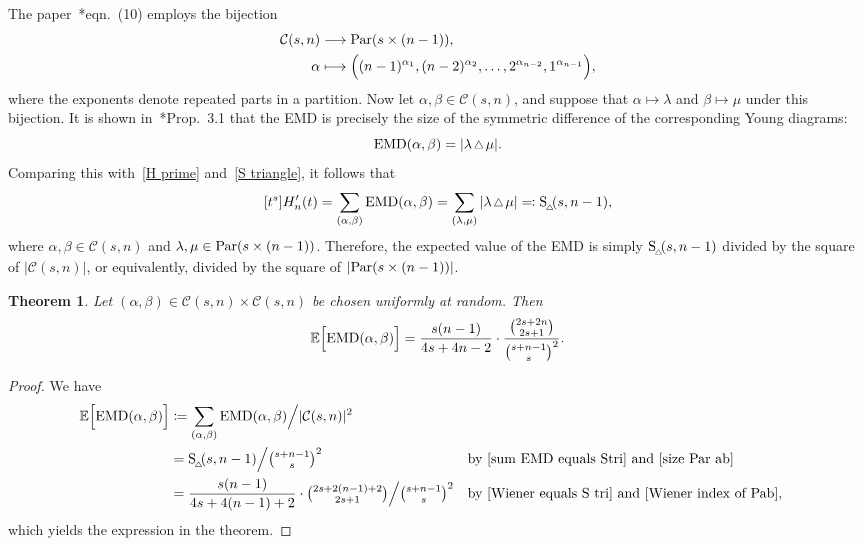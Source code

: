 \documentclass[11pt]{amsart}
\theoremstyle{plain}
\newtheorem{theorem}{Theorem}[section]
\theoremstyle{definition}
\numberwithin{equation}{section}
\newcommand{\C}{\mathcal{C}}
\newcommand{\EMD}{{\rm EMD}}
\newcommand{\Par}{{\rm Par}}
\newcommand{\smtriangle}{\scalebox{.8}{$\,\triangle\,$}}
\newcommand{\Stri}{{\rm S}_{_{\!\triangle\!\!}}}
\begin{document}
The paper~\cite{Erickson23}*{eqn.~(10)} employs the bijection
\begin{align*}
    \C(s,n) &\longrightarrow \Par(s \times (n-1)),\\
    \alpha & \longmapsto \Big((n-1)^{\alpha_1}, (n-2)^{\alpha_2}, \ldots, 2^{\alpha_{n-2}}, 1^{\alpha_{n-1}}\Big),
\end{align*}
where the exponents denote repeated parts in a partition.
Now let $\alpha,\beta \in \C(s,n)$, and suppose that $\alpha \mapsto \lambda$ and $\beta \mapsto \mu$ under this bijection.
It is shown in~\cite{Erickson23}*{Prop.~3.1} that the EMD is precisely the size of the symmetric difference of the corresponding Young diagrams:
\[
    \EMD(\alpha,\beta) = |\lambda \smtriangle \mu|.
\]
Comparing this with~\eqref{H prime} and~\eqref{S triangle}, it follows that 
\begin{equation}
\label{sum EMD equals Stri}
    [t^s] H'_n(t) = \sum_{(\alpha,\beta)} \EMD(\alpha,\beta) = \sum_{(\lambda,\mu)}  |\lambda \smtriangle \mu| \eqqcolon \Stri(s, n-1),
\end{equation}
where $\alpha,\beta \in \C(s,n)$ and $\lambda,\mu \in \Par(s \times (n-1))$.
Therefore, the expected value of the EMD is simply $\Stri(s,n-1)$ divided by the square of $|\C(s,n)|$, or equivalently, divided by the square of $|\Par(s \times (n-1))|$.

\begin{theorem}
    \label{thm:EMD exp val}
    Let $(\alpha, \beta) \in \C(s,n) \times \C(s,n)$ be chosen uniformly at random.
    Then
    \[
    \mathbb{E}\Big[\EMD(\alpha,\beta)\Big] = \frac{s(n-1)}{4s+4n-2} \cdot \frac{\binom{2s+2n}{2s+1}}{\binom{s+n-1}{s}^2}.
    \]
\end{theorem}

\begin{proof}
    We have 
    \begin{align*}
    \mathbb{E}\Big[\EMD(\alpha,\beta)\Big] &\coloneqq \sum_{(\alpha,\beta)} \EMD(\alpha,\beta) \Big/ |\C(s,n)|^2 \\
    &= \Stri(s, n-1) \Big/ \textstyle \binom{s+n-1}{s}^2 && \text{by~\eqref{sum EMD equals Stri} and~\eqref{size Par ab}}\\
    &= \frac{s(n-1)}{4s+4(n-1) + 2} \cdot \textstyle \binom{2s + 2(n-1)+2}{2s+1}\Big/ \binom{s+n-1}{s}^2 && \text{by~\eqref{Wiener equals S tri} and \eqref{Wiener index of Pab},}
    \end{align*}
    which yields the expression in the theorem.
\end{proof}
\end{document}
